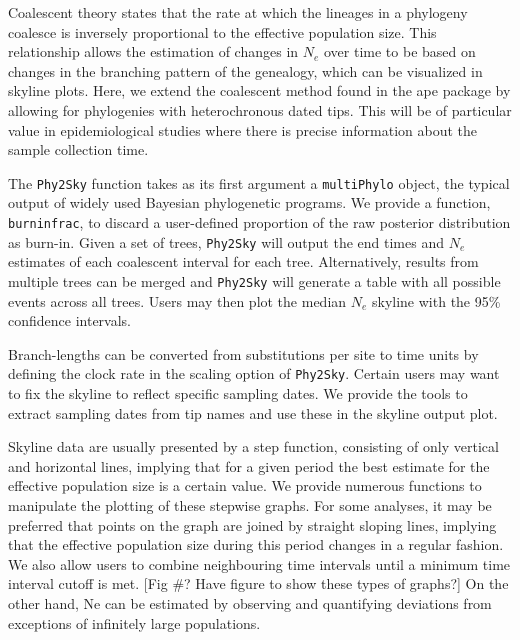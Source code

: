 \documentclass[english,titlepage]{article}
\begin{document}
Coalescent theory states that the rate at which the lineages in a phylogeny coalesce is inversely proportional to the effective population size. This relationship allows the estimation of changes in $N_e$ over time to be based on changes in the branching pattern of the genealogy, which can be visualized in skyline plots. Here, we extend the coalescent method found in the ape package \citep{Paradis2004} by allowing for phylogenies with heterochronous dated tips. This will be of particular value in epidemiological studies where there is precise information about the sample collection time.


The \texttt{Phy2Sky} function takes as its first argument a \texttt{multiPhylo} object, the typical output of widely used Bayesian phylogenetic programs. We provide a function, \texttt{burninfrac}, to discard a user-defined proportion of the raw posterior distribution as burn-in. Given a set of trees, \texttt{Phy2Sky} will output the end times and $N_e$ estimates of each coalescent interval for each tree. Alternatively, results from multiple trees can be merged and \texttt{Phy2Sky} will generate a table with all possible events across all trees. Users may then plot the median $N_e$ skyline with the 95\% confidence intervals.

Branch-lengths can be converted from substitutions per site to time units by defining the clock rate in the scaling option of \texttt{Phy2Sky}. Certain users may want to fix the skyline to reflect specific sampling dates. We provide the tools to extract sampling dates from tip names and use these in the skyline output plot.

Skyline data are usually presented by a step function, consisting of only vertical and horizontal lines, implying that for a given period the best estimate for the effective population size is a certain value. We provide numerous functions to manipulate the plotting of these stepwise graphs. For some analyses, it may be preferred that points on the graph are joined by straight sloping lines, implying that the effective population size during this period changes in a regular fashion. We also allow users to combine neighbouring time intervals until a minimum time interval cutoff is met. [Fig \#? Have figure to show these types of graphs?] 
On the other hand, Ne can be estimated by observing and quantifying deviations from exceptions of infinitely large populations. 
  
\end{document}
